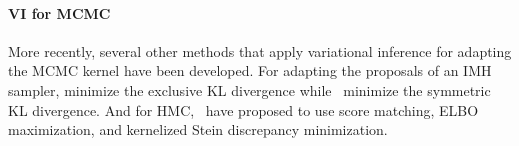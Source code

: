 \vspace{-0.05in}
\paragraph{VI for MCMC}
More recently, several other methods that apply variational inference for adapting the MCMC kernel have been developed.
For adapting the proposals of an IMH sampler, \citet{habib2018auxiliary} minimize the exclusive KL divergence while~\cite{neklyudov_metropolishastings_2019} minimize the symmetric KL divergence.
And for HMC,~\citet{zhang_variational_2018, pmlr-v139-campbell21a} have proposed to use score matching, ELBO maximization, and kernelized Stein discrepancy minimization.



